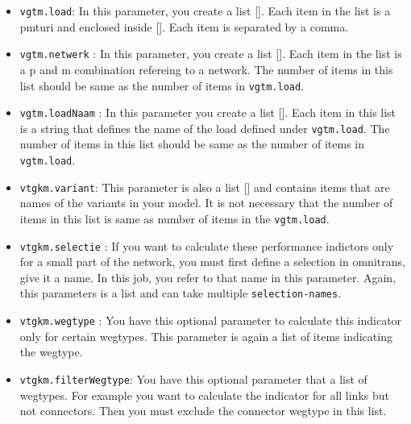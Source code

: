 \documentclass[
  letterpaper,
  DIV=11,
  numbers=noendperiod]{scrreprt}
\begin{document}
\begin{itemize}
\item
  \texttt{vgtm.load}: In this parameter, you create a list {[}{]}. Each
  item in the list is a pmturi and enclosed inside {[}{]}. Each item is
  separated by a comma.
\item
  \texttt{vgtm.netwerk} : In this parameter, you create a list {[}{]}.
  Each item in the list is a p and m combination refereing to a network.
  The number of items in this list should be same as the number of items
  in \texttt{vgtm.load}.
\item
  \texttt{vgtm.loadNaam} : In this parameter you create a list {[}{]}.
  Each item in this list is a string that defines the name of the load
  defined under \texttt{vgtm.load}. The number of items in this list
  should be same as the number of items in \texttt{vgtm.load}.
\item
  \texttt{vtgkm.variant}: This parameter is also a list {[}{]} and
  contains items that are names of the variants in your model. It is not
  necessary that the number of items in this list is same as number of
  items in the \texttt{vgtm.load}.
\item
  \texttt{vtgkm.selectie} : If you want to calculate these performance
  indictors only for a small part of the network, you must first define
  a selection in omnitrans, give it a name. In this job, you refer to
  that name in this parameter. Again, this parameters is a list and can
  take multiple \texttt{selection-names}.
\item
  \texttt{vtgkm.wegtype} : You have this optional parameter to calculate
  this indicator only for certain wegtypes. This parameter is again a
  list of items indicating the wegtype.
\item
  \texttt{vtgkm.filterWegtype}: You have this optional parameter that a
  list of wegtypes. For example you want to calculate the indicator for
  all links but not connectors. Then you must exclude the connector
  wegtype in this list.
\end{itemize}
\end{document}
